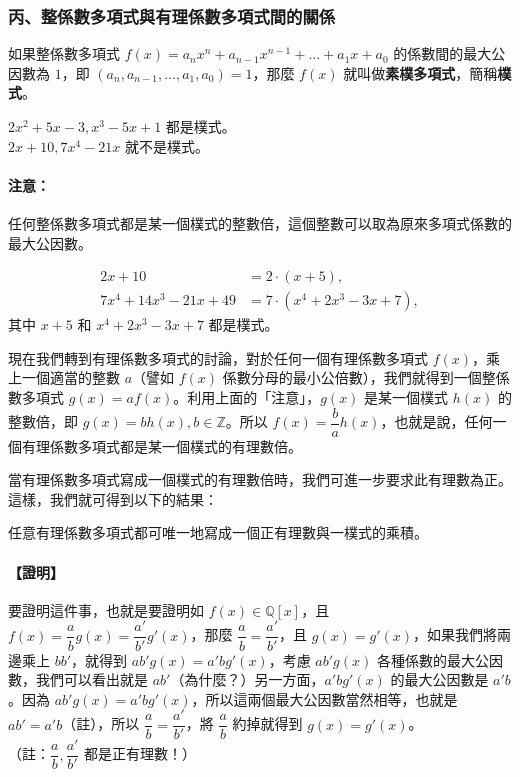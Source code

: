 \subsubsection*{丙、整係數多項式與有理係數多項式間的關係}\label{subsec:7-2-c}

\begin{definition*}
如果整係數多項式 $f(x) = a_n x^n + a_{n-1} x^{n-1} + \dots + a_1 x + a_0$ 的係數間的最大公因數為 $1$，即 $(a_n, a_{n-1}, \dots, a_1, a_0) = 1$，那麼 $f(x)$ 就叫做\textbf{素樸多項式}，簡稱\textbf{樸式}。
\end{definition*}

\begin{example}\label{ex:7-2-10}
$2x^2+5x-3, x^3-5x+1$ 都是樸式。\\
$2x+10, 7x^4-21x$ 就不是樸式。
\end{example}

\paragraph{注意：}
任何整係數多項式都是某一個樸式的整數倍，這個整數可以取為原來多項式係數的最大公因數。

\begin{example}\label{ex:7-2-11}
\begin{align*}
  2x+10 &= 2 \cdot (x+5), \\
  7x^4+14x^3-21x+49 &= 7 \cdot (x^4+2x^3-3x+7),
\end{align*}
其中 $x+5$ 和 $x^4+2x^3-3x+7$ 都是樸式。
\end{example}

現在我們轉到有理係數多項式的討論，對於任何一個有理係數多項式 $f(x)$，乘上一個適當的整數 $a$（譬如 $f(x)$ 係數分母的最小公倍數），我們就得到一個整係數多項式 $g(x) = af(x)$。利用上面的「注意」，$g(x)$ 是某一個樸式 $h(x)$ 的整數倍，即 $g(x) = bh(x), b \in \mathbb{Z}$。所以 $f(x) = \dfrac{b}{a} h(x)$，也就是說，任何一個有理係數多項式都是某一個樸式的有理數倍。

當有理係數多項式寫成一個樸式的有理數倍時，我們可進一步要求此有理數為正。這樣，我們就可得到以下的結果：

\begin{prop}\label{prop:primitive_unique}
任意有理係數多項式都可唯一地寫成一個正有理數與一樸式的乘積。
\end{prop}

\paragraph{【證明】}
要證明這件事，也就是要證明如 $f(x) \in \mathbb{Q}[x]$，且 $f(x) = \dfrac{a}{b} g(x) = \dfrac{a'}{b'} g'(x)$，那麼 $\dfrac{a}{b} = \dfrac{a'}{b'}$，且 $g(x) = g'(x)$，如果我們將兩邊乘上 $bb'$，就得到 $ab' g(x) = a'b g'(x)$，考慮 $ab' g(x)$ 各種係數的最大公因數，我們可以看出就是 $ab'$（為什麼？）另一方面，$a'b g'(x)$ 的最大公因數是 $a'b$。因為 $ab' g(x) = a'b g'(x)$，所以這兩個最大公因數當然相等，也就是 $ab' = a'b$（註），所以 $\dfrac{a}{b} = \dfrac{a'}{b'}$，將 $\dfrac{a}{b}$ 約掉就得到 $g(x) = g'(x)$。\\
（註：$\dfrac{a}{b}, \dfrac{a'}{b'}$ 都是正有理數！）

